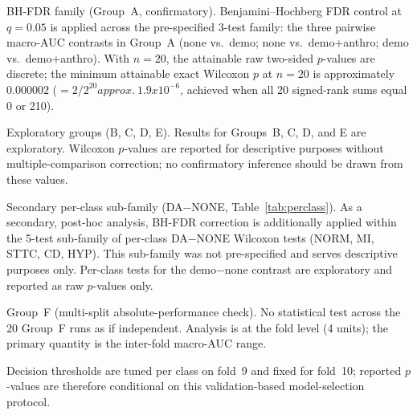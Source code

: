 \documentclass[mathematics,article,submit,pdftex]{Definitions/mdpi}
\def\texttt#1{#1}%
\def\textbf#1{#1}%
\def\times{x}%
\def\approx{approx.\ }%
\begin{document}
\textbf{BH-FDR family (Group~A, confirmatory).} Benjamini--Hochberg FDR control at $q{=}0.05$ is applied across the \textbf{pre-specified 3-test family}: the three pairwise macro-AUC contrasts in Group~A (none vs.\ demo; none vs.\ demo+anthro; demo vs.\ demo+anthro). With $n{=}20$, the attainable raw two-sided $p$-values are discrete; the minimum attainable exact Wilcoxon $p$ at $n{=}20$ is approximately $0.000002$ ($= 2/2^{20} \approx 1.9\times10^{-6}$, achieved when all 20 signed-rank sums equal 0 or 210).

\textbf{Exploratory groups (B, C, D, E).} Results for Groups~B, C, D, and E are exploratory. Wilcoxon $p$-values are reported for descriptive purposes without multiple-comparison correction; no confirmatory inference should be drawn from these values.

\textbf{Secondary per-class sub-family (DA$-$NONE, Table~\ref{tab:perclass}).} As a secondary, post-hoc analysis, BH-FDR correction is additionally applied within the 5-test sub-family of per-class DA$-$NONE Wilcoxon tests (NORM, MI, STTC, CD, HYP). This sub-family was not pre-specified and serves descriptive purposes only. Per-class tests for the \texttt{demo}$-$\texttt{none} contrast are exploratory and reported as raw $p$-values only.

\textbf{Group~F (multi-split absolute-performance check).} No statistical test across the 20 Group~F runs as if independent. Analysis is at the fold level (4 units); the primary quantity is the inter-fold macro-AUC range.

Decision thresholds are tuned per class on fold~9 and fixed for fold~10; reported $p$-values are therefore conditional on this validation-based model-selection protocol.
\end{document}
